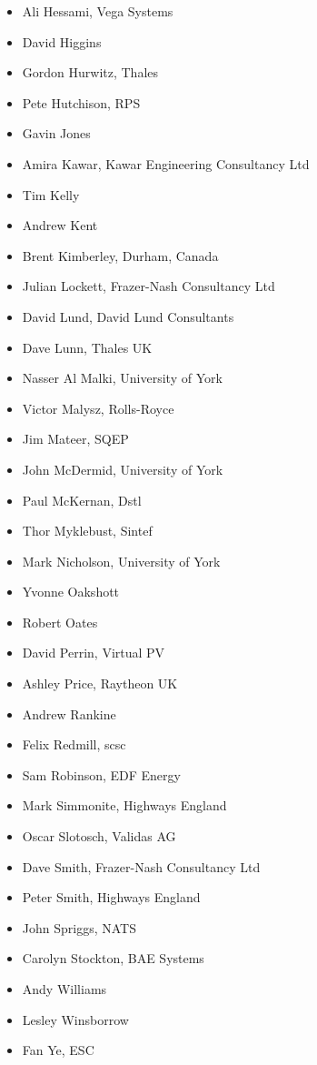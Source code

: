 \begin{itemize}
  \item Ali Hessami, Vega Systems
  \item David Higgins
  \item Gordon Hurwitz, Thales
  \item Pete Hutchison, RPS
  \item Gavin Jones
  \item Amira Kawar, Kawar Engineering Consultancy Ltd
  \item Tim Kelly
  \item Andrew Kent
  \item Brent Kimberley, Durham, Canada
  \item Julian Lockett, Frazer-Nash Consultancy Ltd
  \item David Lund, David Lund Consultants
  \item Dave Lunn, Thales UK
  \item Nasser Al Malki, University of York
  \item Victor Malysz, Rolls-Royce
  \item Jim Mateer, SQEP
  \item John McDermid, University of York
  \item Paul McKernan, Dstl
  \item Thor Myklebust, Sintef
  \item Mark Nicholson, University of York
  \item Yvonne Oakshott
  \item Robert Oates
  \item David Perrin, Virtual PV
  \item Ashley Price, Raytheon UK
  \item Andrew Rankine
  \item Felix Redmill, \gls{scsc}
  \item Sam Robinson, EDF Energy
  \item Mark Simmonite, Highways England
  \item Oscar Slotosch, Validas AG
  \item Dave Smith, Frazer-Nash Consultancy Ltd
  \item Peter Smith, Highways England
  \item John Spriggs, NATS
  \item Carolyn Stockton, BAE Systems
  \item Andy Williams
  \item Lesley Winsborrow
  \item Fan Ye, ESC
\end{itemize}

